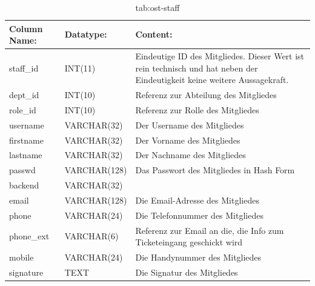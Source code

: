 \begin{table}[h]
	\begin{tabular}{|p{3.5cm}|p{4cm}|p{6.2cm}|}
		\hline
		\textbf{Column Name:} & \textbf{Datatype:} & \textbf{Content:}\\
		\hline
		staff\_id & INT(11) & Eindeutige ID des Mitgliedes. Dieser Wert ist rein technisch und hat neben der Eindeutigkeit keine weitere 
		Aussagekraft.\\
		\hline
		dept\_id & INT(10) & Referenz zur Abteilung des Mitgliedes \\
		\hline
		role\_id & INT(10) & Referenz zur Rolle des Mitgliedes\\
		\hline
		username & VARCHAR(32) & Der Username des Mitgliedes\\
		\hline
		firstname & VARCHAR(32) & Der Vorname des Mitgliedes\\
		\hline
		lastname & VARCHAR(32) &  Der Nachname des Mitgliedes\\
		\hline
		passwd & VARCHAR(128) & Das Passwort des Mitgliedes in Hash Form \\
		\hline
		backend & VARCHAR(32) & \\
		\hline
		email & VARCHAR(128) & Die Email-Adresse des Mitgliedes \\
		\hline
		phone & VARCHAR(24) & Die Telefonnummer des Mitgliedes \\
		\hline
		phone\_ext & VARCHAR(6) & Referenz zur Email an die, die Info zum Ticketeingang geschickt wird \\
		\hline
		mobile & VARCHAR(24) & Die Handynummer des Mitgliedes \\
		\hline
		signature & TEXT & Die Signatur des Mitgliedes \\
		\hline
			\end{tabular}
			\caption{tab:ost-staff}
		\end{table}
		\label{tab:ost_staff}
		\newpage
